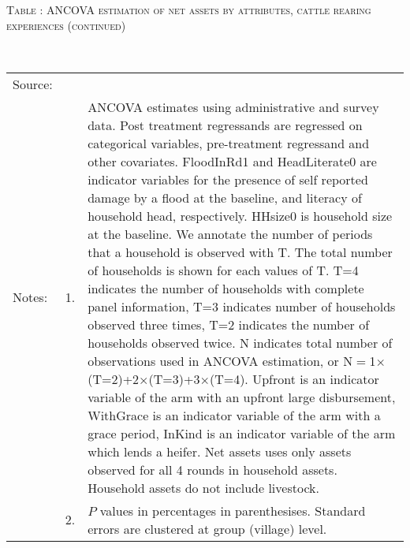 \addtocounter{table}{-1}
\hspace{-1cm}\begin{minipage}[t]{14cm}
\hfil\textsc{\normalsize Table \thetable: ANCOVA estimation of net assets by attributes, cattle rearing experiences (continued)\label{tab ANCOVA narrow net assets Experience attributes 2}}\\
\setlength{\tabcolsep}{1pt}
\setlength{\baselineskip}{8pt}
\renewcommand{\arraystretch}{.52}
\hfil{}\\
\renewcommand{\arraystretch}{.8}
\setlength{\tabcolsep}{1pt}
\begin{tabular}{>{\hfill\scriptsize}p{1cm}<{}>{\hfill\scriptsize}p{.25cm}<{}>{\scriptsize}p{12cm}<{\hfill}}
Source:& \multicolumn{2}{l}{\scriptsize Estimated with GUK administrative and survey data.}\\
Notes: & 1. & ANCOVA estimates using administrative and survey data. Post treatment regressands are regressed on categorical variables, pre-treatment regressand and other covariates. \textsf{FloodInRd1} and \textsf{HeadLiterate0} are indicator variables for the presence of self reported damage by a flood at the baseline, and literacy of household head, respectively. \textsf{HHsize0} is household size at the baseline. We annotate the number of periods that a household is observed with \textsf{T}. The total number of households is shown for each values of \textsf{T}. \textsf{T=4} indicates the number of households with complete panel information, \textsf{T=3} indicates number of households observed three times, \textsf{T=2} indicates the number of households observed twice. \textsf{N} indicates total number of observations used in ANCOVA estimation, or \textsf{N$=$1$\times$(T=2)+2$\times$(T=3)+3$\times$(T=4)}.  \textsf{Upfront} is an indicator variable of the arm with an upfront large disbursement, \textsf{WithGrace} is an indicator variable of the arm with a grace period, \textsf{InKind} is an indicator variable of the arm which lends a heifer. Net assets uses only assets observed for all 4 rounds in household assets. Household assets do not include livestock. \\
& 2. & $P$ values in percentages in parenthesises. Standard errors are clustered at group (village) level.
\end{tabular}
\end{minipage}



